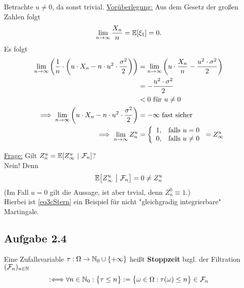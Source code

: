 \begin{lösung}
	Betrachte $u\neq0$, da sonst trivial.\nl
	\underline{Vorüberlegung:}
	Aus dem Gesetz der großen Zahlen folgt
	\begin{align*}
		\lim\limits_{n\to\infty}\frac{X_n}{n}=\mathbb{E}[\xi_1]=0.
	\end{align*}
	Es folgt
	\begin{align*}
		\lim\limits_{n\to\infty}\left(\frac{1}{n}\cdot\left( u\cdot X_n-n\cdot u^2\cdot\frac{\sigma^2}{2}\right)\right)
		&=\lim\limits_{n\to\infty}\left(u\cdot\frac{X_n}{n}-\frac{u^2\cdot\sigma^2}{2}\right)\\
		&=-\frac{u^2\cdot\sigma^2}{2}\\
		&<0\text{ für }u\neq0\\
		\implies
		\lim\limits_{n\to\infty}\left( u\cdot X_n-n\cdot u^2\cdot\frac{\sigma^2}{2}\right)&=-\infty\text{ fast sicher }\\
		\implies
		\lim\limits_{n\to\infty} Z_n^u&=\left\lbrace\begin{array}{cl}
			1, & \text{falls } u=0\\
			0, & \text{falls } u\neq 0
		\end{array}\right.
		=Z_\infty^u
	\end{align*}
	
	\underline{Frage:} Gilt $Z_n^u=\mathbb{E}[Z_\infty^u~|~\mathcal{F}_n]$?\\
	Nein! Denn 
	\begin{align}\label{eq3cStern}
		\mathbb{E}\big[Z_\infty^u~\big|~\mathcal{F}_n\big]=0\neq Z_n^u
	\end{align}
	(Im Fall $u=0$ gilt die Aussage, ist aber trvial, denn $Z_n^0\equiv 1$.)\\
	Hierbei ist \eqref{eq3cStern} ein Beispiel für nicht "gleichgradig integrierbare" Martingale.
\end{lösung}

\subsection{Aufgabe 2.4}
\begin{defi}
	Eine Zufallsvariable $\tau:\Omega\to\mathbb{N}_0\cup\lbrace+\infty\rbrace$ heißt \textbf{Stoppzeit} bzgl. der Filtration $(\mathcal{F}_n)_{n\in\mathbb{N}}$
	\begin{align*}
		:\Longleftrightarrow\forall n\in\mathbb{N}_0:\big\lbrace\tau\leq n\big\rbrace:=\big\lbrace \omega\in\Omega:\tau(\omega)\leq n\big\rbrace\in\mathcal{F}_n
	\end{align*}
\end{defi}

